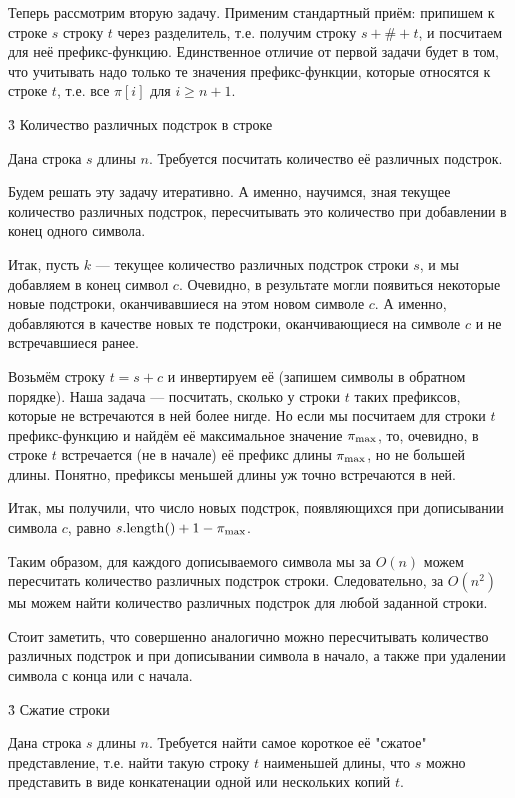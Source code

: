 Теперь рассмотрим вторую задачу. Применим стандартный приём: припишем к строке $s$ строку $t$ через разделитель, т.е. получим строку $s+\#+t$, и посчитаем для неё префикс-функцию. Единственное отличие от первой задачи будет в том, что учитывать надо только те значения префикс-функции, которые относятся к строке $t$, т.е. все $\pi[i]$ для $i \ge n+1$.


\h3{ Количество различных подстрок в строке }

Дана строка $s$ длины $n$. Требуется посчитать количество её различных подстрок.

Будем решать эту задачу итеративно. А именно, научимся, зная текущее количество различных подстрок, пересчитывать это количество при добавлении в конец одного символа.

Итак, пусть $k$ --- текущее количество различных подстрок строки $s$, и мы добавляем в конец символ $c$. Очевидно, в результате могли появиться некоторые новые подстроки, оканчивавшиеся на этом новом символе $c$. А именно, добавляются в качестве новых те подстроки, оканчивающиеся на символе $c$ и не встречавшиеся ранее.

Возьмём строку $t = s + c$ и инвертируем её (запишем символы в обратном порядке). Наша задача --- посчитать, сколько у строки $t$ таких префиксов, которые не встречаются в ней более нигде. Но если мы посчитаем для строки $t$ префикс-функцию и найдём её максимальное значение $\pi_{\rm max}$, то, очевидно, в строке $t$ встречается (не в начале) её префикс длины $\pi_{\rm max}$, но не большей длины. Понятно, префиксы меньшей длины уж точно встречаются в ней.

Итак, мы получили, что число новых подстрок, появляющихся при дописывании символа $c$, равно $s.{\rm length}() + 1 - \pi_{\rm max}$.

Таким образом, для каждого дописываемого символа мы за $O(n)$ можем пересчитать количество различных подстрок строки. Следовательно, за $O(n^2)$ мы можем найти количество различных подстрок для любой заданной строки.

Стоит заметить, что совершенно аналогично можно пересчитывать количество различных подстрок и при дописывании символа в начало, а также при удалении символа с конца или с начала.


\h3{ Сжатие строки }

Дана строка $s$ длины $n$. Требуется найти самое короткое её "сжатое" представление, т.е. найти такую строку $t$ наименьшей длины, что $s$ можно представить в виде конкатенации одной или нескольких копий $t$.

